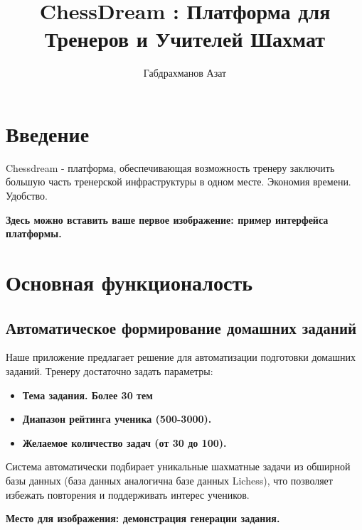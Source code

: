 \documentclass[a4paper,12pt]{article}
\title{ChessDream : Платформа для Тренеров и Учителей Шахмат}
\author{Габдрахманов Азат}
\date{}
\begin{document}
\maketitle
\tableofcontents
\newpage

\section{Введение}

Chessdream - платформа, обеспечивающая возможность тренеру заключить большую часть тренерской инфраструктуры в одном месте.
Экономия времени. Удобство.

\vspace{0.5cm}
\noindent
\textbf{Здесь можно вставить ваше первое изображение: пример интерфейса платформы.}
\begin{center}
\end{center}
\vspace{0.5cm}

\section{Основная функционалость}

\subsection{Автоматическое формирование домашних заданий}
Наше приложение предлагает решение для автоматизации подготовки домашних заданий. Тренеру достаточно задать параметры:
\begin{itemize}
    \item \textbf{Тема задания. Более 30 тем}
    \item \textbf{Диапазон рейтинга ученика (500-3000).}
    \item \textbf{Желаемое количество задач (от 30 до 100).}
\end{itemize}
Система автоматически подбирает уникальные шахматные задачи из обширной базы данных (база данных аналогична базе данных Lichess), что позволяет избежать повторения и поддерживать интерес учеников.

\vspace{0.5cm}
\noindent
\textbf{Место для изображения: демонстрация генерации задания.}
\begin{center}
\end{center}
\vspace{0.5cm}
\end{document}
